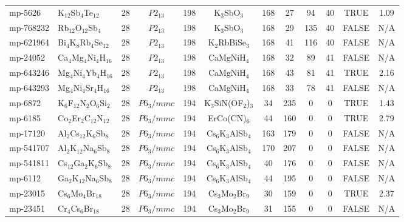 {\begin{longtable}{llcccccccccc}
    mp-5626 & K$_{12}$Sb$_{4}$Te$_{12}$ & 28    & $P2_13$ & 198   & K$_{3}$SbO$_{3}$ & 168   & 27    & 94    & 40    & TRUE  & 1.09  \\
    mp-768232 & Rb$_{12}$O$_{12}$Sb$_{4}$ & 28    & $P2_13$ & 198   & K$_{3}$SbO$_{3}$ & 168   & 29    & 135   & 40    & FALSE & N/A \\
    mp-621964 & Bi$_{4}$K$_{8}$Rb$_{4}$Se$_{12}$ & 28    & $P2_13$ & 198   & K$_{2}$RbBiSe$_{3}$ & 168   & 41    & 116   & 40    & FALSE & N/A \\
    mp-24052 & Ca$_{4}$Mg$_{4}$Ni$_{4}$H$_{16}$ & 28    & $P2_13$ & 198   & CaMgNiH$_{4}$ & 168   & 32    & 89    & 41    & FALSE & N/A \\
    mp-643246 & Mg$_{4}$Ni$_{4}$Yb$_{4}$H$_{16}$ & 28    & $P2_13$ & 198   & CaMgNiH$_{4}$ & 168   & 43    & 81    & 41    & TRUE  & 2.16  \\
    mp-643293 & Mg$_{4}$Ni$_{4}$Sr$_{4}$H$_{16}$ & 28    & $P2_13$ & 198   & CaMgNiH$_{4}$ & 168   & 33    & 78    & 41    & FALSE & N/A \\
    mp-6872 & K$_{6}$F$_{12}$N$_{2}$O$_{6}$Si$_{2}$ & 28    & $P6_3/mmc$ & 194   & K$_{3}$SiN(OF$_{2}$)$_{3}$ & 34    & 235   & 0     & 0     & TRUE  & 1.43  \\
    mp-6185 & Co$_{2}$Er$_{2}$C$_{12}$N$_{12}$ & 28    & $P6_3/mmc$ & 194   & ErCo(CN)$_{6}$ & 44    & 160   & 0     & 0     & TRUE  & 2.79  \\
    mp-17120 & Al$_{2}$Cs$_{12}$K$_{6}$Sb$_{8}$ & 28    & $P6_3/mmc$ & 194   & Cs$_{6}$K$_{3}$AlSb$_{4}$ & 163   & 179   & 0     & 0     & FALSE & N/A \\
    mp-541707 & Al$_{2}$K$_{12}$Na$_{6}$Sb$_{8}$ & 28    & $P6_3/mmc$ & 194   & Cs$_{6}$K$_{3}$AlSb$_{4}$ & 170   & 207   & 0     & 0     & FALSE & N/A \\
    mp-541811 & Cs$_{12}$Ga$_{2}$K$_{6}$Sb$_{8}$ & 28    & $P6_3/mmc$ & 194   & Cs$_{6}$K$_{3}$AlSb$_{4}$ & 40    & 176   & 0     & 0     & FALSE & N/A \\
    mp-6112 & Ga$_{2}$K$_{12}$Na$_{6}$Sb$_{8}$ & 28    & $P6_3/mmc$ & 194   & Cs$_{6}$K$_{3}$AlSb$_{4}$ & 44    & 195   & 0     & 0     & FALSE & N/A \\
    mp-23015 & Cs$_{6}$Mo$_{4}$Br$_{18}$ & 28    & $P6_3/mmc$ & 194   & Cs$_{3}$Mo$_{2}$Br$_{9}$ & 30    & 159   & 0     & 0     & TRUE  & 2.37  \\
    mp-23451 & Cr$_{4}$Cs$_{6}$Br$_{18}$ & 28    & $P6_3/mmc$ & 194   & Cs$_{3}$Mo$_{2}$Br$_{9}$ & 31    & 155   & 0     & 0     & FALSE & N/A \\

\end{longtable}}
